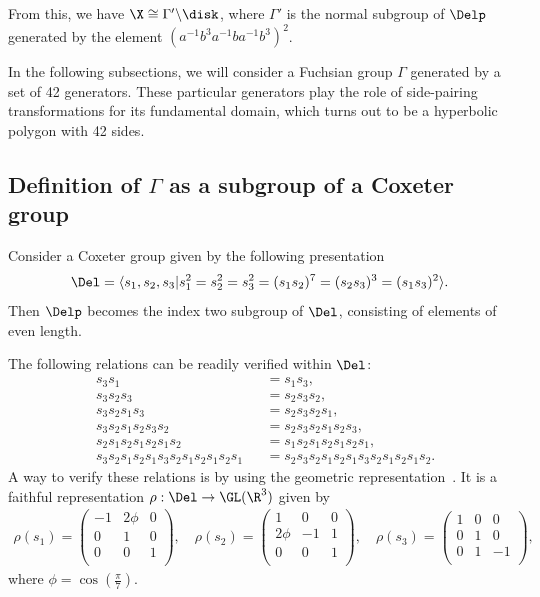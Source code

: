 From this, we have $\X\cong \Gamma'\backslash\disk$, where $\Gamma'$ is the normal subgroup of $\Delp$ generated by the element $(a^{-1} b^3 a^{-1} b a^{-1} b^3)^2$.

In the following subsections, we will consider a Fuchsian group $\Gamma$ generated by a set of 42 generators.
These particular generators play the role of side-pairing transformations for its fundamental domain, which turns out to be a hyperbolic polygon with 42 sides.


\subsection{Definition of $\Gamma$ as a subgroup of a Coxeter group}
Consider a Coxeter group given by the following presentation
\[
\Del = \langle s_1,s_2,s_3 | s_1^2 = s_2^2 = s_3^2 = (s_1s_2)^7=(s_2s_3)^3=(s_1s_3)^2 \rangle.
\]
Then $\Delp$ becomes the index two subgroup of $\Del$, consisting of elements of even length.

The following relations can be readily verified within $\Del$:
\begin{equation}
\label{eq:coxrelation}
\begin{alignedat}{2}
& s_3s_1 && = s_1s_3, \\
& s_3s_2s_3 && = s_2s_3s_2, \\
& s_3s_2s_1s_3 && = s_2s_3s_2s_1, \\
& s_3s_2s_1s_2s_3s_2 && = s_2s_3s_2s_1s_2s_3, \\
& s_2s_1s_2s_1s_2s_1s_2 && = s_1s_2s_1s_2s_1s_2s_1, \\
& s_3s_2s_1s_2s_1s_3s_2s_1s_2s_1s_2s_1 && = s_2s_3s_2s_1s_2s_1s_3s_2s_1s_2s_1s_2.
\end{alignedat}
\end{equation}
A way to verify these relations is by using the geometric representation~\cite[5.3]{MR1066460}.
It is a faithful representation $\rho : \Del \to \GL(\R^3)$ given by
\begin{align*}
\rho(s_1) =
\begin{pmatrix}
-1 & 2\phi & 0 \\
0 & 1 & 0 \\
0 & 0 & 1 \\
\end{pmatrix}, \quad
\rho(s_2) = 
\begin{pmatrix}
1 & 0 & 0 \\
2\phi & -1 & 1 \\
0 & 0 & 1 \\
\end{pmatrix}, \quad
\rho(s_3) = 
\begin{pmatrix}
1 & 0 & 0 \\
0 & 1 & 0 \\
0 & 1 & -1 \\
\end{pmatrix},
\end{align*}
where $\phi = \cos(\frac{\pi}{7})$.

